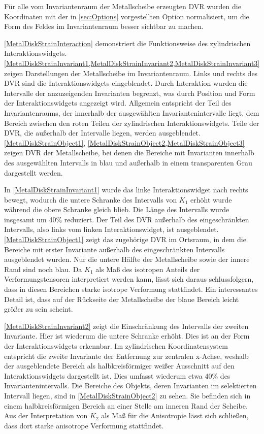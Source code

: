 \documentclass[a4paper,fontsize=12pt,toc=bib,parskip=half,ngerman]{scrartcl}
\begin{document}
F\"ur alle vom Invariantenraum der Metallscheibe erzeugten DVR wurden die Koordinaten mit der in \ref{sec:Options} vorgestellten Option normalisiert, um die Form des Feldes im Invariantenraum besser sichtbar zu machen.

\cref{MetalDiskStrainInteraction} demonstriert die Funktionsweise des zylindrischen Interaktionswidgets. \cref{MetalDiskStrainInvariant1,MetalDiskStrainInvariant2,MetalDiskStrainInvariant3} zeigen Darstellungen der Metallscheibe im Invariantenraum. Links und rechts des DVR sind die Interaktionswidgets eingeblendet. Durch Interaktion wurden die Intervalle der anzuzeigenden Invarianten begrenzt, was durch Position und Form der Interaktionswidgets angezeigt wird. Allgemein entspricht der Teil des Invariantenraums, der innerhalb der ausgew\"ahlten Invariantenintervalle liegt, dem Bereich zwischen den roten Teilen der zylindrischen Interaktionswidgets. Teile der DVR, die au{\ss}erhalb der Intervalle liegen, werden ausgeblendet. \cref{MetalDiskStrainObject1}, \cref{MetalDiskStrainObject2,MetalDiskStrainObject3} zeigen DVR der Metallscheibe, bei denen die Bereiche mit Invarianten innerhalb des ausgew\"ahlten Intervalls in blau und au{\ss}erhalb in einem transparenten Grau dargestellt werden.

In \cref{MetalDiskStrainInvariant1} wurde das linke Interaktionswidget nach rechts bewegt, wodurch die untere Schranke des Intervalls von $K_1$ erh\"oht wurde w\"ahrend die obere Schranke gleich blieb. Die L\"ange des Intervalls wurde insgesamt um 40\% reduziert. Der Teil des DVR au{\ss}erhalb des eingeschr\"ankten Intervalls, also links vom linken Interaktionswidget, ist ausgeblendet. \cref{MetalDiskStrainObject1} zeigt das zugeh\"orige DVR im Ortsraum, in dem die Bereiche mit erster Invariante au{\ss}erhalb des eingeschr\"ankten Intervalls ausgeblendet wurden. Nur die untere H\"alfte der Metallscheibe sowie der innere Rand sind noch blau. Da $K_1$ als Ma{\ss} des isotropen Anteils der Verformungstensoren interpretiert werden kann, l\"asst sich daraus schlussfolgern, dass in diesen Bereichen starke isotrope Verformung stattfindet. Ein interessantes Detail ist, dass auf der R\"uckseite der Metallscheibe der blaue Bereich leicht gr\"o{\ss}er zu sein scheint.

\cref{MetalDiskStrainInvariant2} zeigt die Einschr\"ankung des Intervalls der zweiten Invariante. Hier ist wiederum die untere Schranke erh\"oht. Dies ist an der Form der Interaktionswidgets erkennbar. Im zylindrischen Koordinatensystem entspricht die zweite Invariante der Entfernung zur zentralen x-Achse, weshalb der ausgeblendete Bereich als halbkreisf\"ormiger wei{\ss}er Ausschnitt auf den Interaktionswidgets dargestellt ist. Dies umfasst wiederum etwa 40\% des Invariantenintervalls. Die Bereiche des Objekts, deren Invarianten im selektierten Intervall liegen, sind in \cref{MetalDiskStrainObject2} zu sehen. Sie befinden sich in einem halbkreisf\"ormigen Bereich an einer Stelle am inneren Rand der Scheibe. Aus der Interpretation von $K_2$ als Ma{\ss} f\"ur die Anisotropie l\"asst sich schlie{\ss}en, dass dort starke anisotrope Verformung stattfindet.
\end{document}
